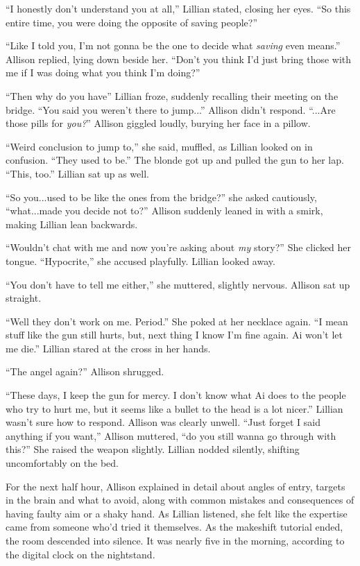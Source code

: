 \begin{Standard}
``I honestly don't understand you at all,'' Lillian stated, closing her eyes. ``So
this entire time, you were doing the opposite of saving people?''

``Like I told you, I'm not gonna be the one to decide what \emph{saving} even means.''
Allison replied, lying down beside her. ``Don't you think I'd just bring those with me
if I was doing what you think I'm doing?''

``Then why do you have\textemdash{}'' Lillian froze, suddenly recalling their meeting
on the bridge. ``You said you weren't there to jump...'' Allison didn't respond.
``...Are those pills for \emph{you?}'' Allison giggled loudly, burying her face in a pillow.

``Weird conclusion to jump to,'' she said, muffled, as Lillian looked on in confusion.
``They used to be.'' The blonde got up and pulled the gun to her lap. ``This, too.''
Lillian sat up as well.

``So you...used to be like the ones from the bridge?'' she asked cautiously, ``what...made
you decide not to?'' Allison suddenly leaned in with a smirk, making Lillian lean backwards.

``Wouldn't chat with me and now you're asking about \emph{my} story?'' She clicked her tongue.
``Hypocrite,'' she accused playfully. Lillian looked away.

``You don't have to tell me either,'' she muttered, slightly nervous. Allison sat up straight.

``Well they don't work on me. Period.'' She poked at her necklace again. ``I mean stuff like
the gun still hurts, but, next thing I know I'm fine again. Ai won't let me die.'' Lillian
stared at the cross in her hands.

``The angel again?'' Allison shrugged.

``These days, I keep the gun for mercy. I don't know what Ai does to the people who try to
hurt me, but it seems like a bullet to the head is a lot nicer.'' Lillian wasn't sure how
to respond. Allison was clearly unwell. ``Just forget I said anything if you want,''
Allison muttered, ``do you still wanna go through with this?'' She raised the weapon slightly.
Lillian nodded silently, shifting uncomfortably on the bed.

For the next half hour, Allison explained in detail about angles of entry, targets in the brain
and what to avoid, along with common mistakes and consequences of having faulty aim or a shaky hand.
As Lillian listened, she felt like the expertise came from someone who'd tried it themselves. As
the makeshift tutorial ended, the room descended into silence. It was nearly five in the morning,
according to the digital clock on the nightstand.


\end{Standard}
